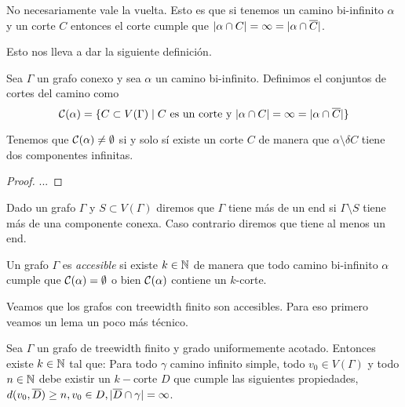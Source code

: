 \documentclass[tesis.tex]{subfiles}
\begin{document}
No necesariamente vale la vuelta.
Esto es que si tenemos un camino bi-infinito $\alpha$ y un corte $C$ entonces el corte cumple que $|\alpha \cap C| = \infty = |\alpha \cap \overline C|$.

Esto nos lleva a dar la siguiente definición.

\begin{deff}
	Sea $\Gamma$ un grafo conexo y sea $\alpha$ un camino bi-infinito.
	Definimos el conjuntos de cortes del camino como 
	\[
		{\cal C}(\alpha) = \{ C \subset V(\Gamma) \mid  C \ \text{es un corte y} \ |\alpha \cap C| = \infty = |\alpha \cap \overline C| \}
	\] 
\end{deff}

\begin{lema}
Tenemos que ${\cal C}(\alpha) \neq \emptyset$ si y solo sí existe un corte $C$ de manera que $\alpha \setminus \delta C$ tiene dos componentes infinitas.
\end{lema}
\begin{proof}
	...
\end{proof}	
	
\begin{deff}
	Dado un grafo $\Gamma$ y $S \subset V(\Gamma)$ diremos que $\Gamma$ tiene más de un end si $\Gamma \setminus S$ tiene más de una componente conexa.
	Caso contrario diremos que tiene al menos un end.
\end{deff}


\begin{deff}
	Un grafo $\Gamma$ es \emph{accesible} si existe $k \in \mathbb{N}$ de manera que todo camino bi-infinito $\alpha$ cumple que ${\cal C}(\alpha) = \emptyset$ o bien ${\cal C}(\alpha)$ contiene un $k$-corte.
\end{deff}

Veamos que los grafos con treewidth finito son accesibles.
Para eso primero veamos un lema un poco más técnico.


\begin{lema}\label{lema_corte_treewidth}
	Sea $\Gamma$ un grafo de treewidth finito y grado uniformemente acotado.
	Entonces existe $k \in \mathbb{N}$ tal que:
	Para todo $\gamma$ camino infinito simple, todo $v_0 \in V(\Gamma)$ y todo $n \in \mathbb{N}$ debe existir un $k-$corte $D$ que cumple las siguientes propiedades, $d(v_0,\overline D) \ge n, v_0 \in D, |\overline D \cap \gamma| = \infty$. 
\end{lema}
\end{document}
